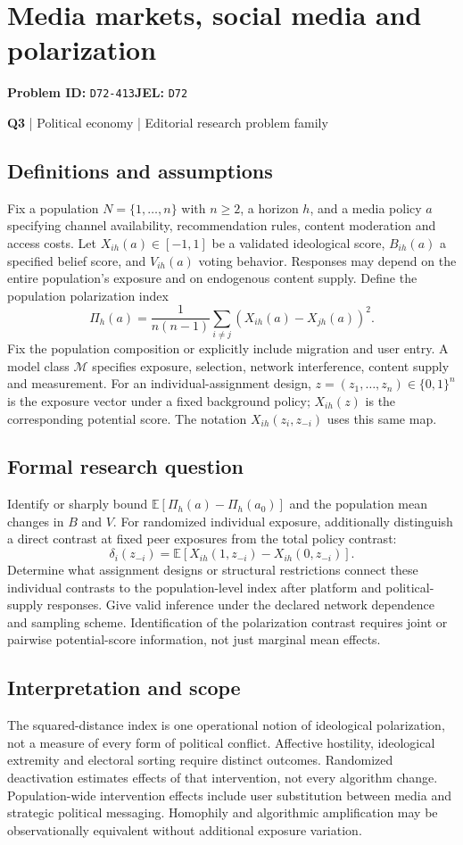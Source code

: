 \documentclass[11pt,a4paper]{article}
\begin{document}
\section*{Media markets, social media and polarization}
\textbf{Problem ID:} \texttt{D72-413}\quad \textbf{JEL:} \texttt{D72}\par
\label{problem:OP-0123}
\label{atlas:prob:Q3}
{\sffamily\small\color{muted}\textbf{Q3} | Political economy | Editorial research problem family\par}
\subsection*{Definitions and assumptions}
Fix a population $N=\{1,\ldots,n\}$ with $n\geq2$, a horizon $h$, and a media policy $a$ specifying channel availability, recommendation rules, content moderation and access costs. Let $X_{ih}(a)\in[-1,1]$ be a validated ideological score, $B_{ih}(a)$ a specified belief score, and $V_{ih}(a)$ voting behavior. Responses may depend on the entire population's exposure and on endogenous content supply. Define the population polarization index
\[
\Pi_h(a)=\frac{1}{n(n-1)}\sum_{i\ne j}(X_{ih}(a)-X_{jh}(a))^2.
\]
Fix the population composition or explicitly include migration and user entry. A model class $\mathcal M$ specifies exposure, selection, network interference, content supply and measurement. For an individual-assignment design, $z=(z_1,\ldots,z_n)\in\{0,1\}^n$ is the exposure vector under a fixed background policy; $X_{ih}(z)$ is the corresponding potential score. The notation $X_{ih}(z_i,z_{-i})$ uses this same map.
\subsection*{Formal research question}
Identify or sharply bound $\mathbb E[\Pi_h(a)-\Pi_h(a_0)]$ and the population mean changes in $B$ and $V$. For randomized individual exposure, additionally distinguish a direct contrast at fixed peer exposures from the total policy contrast:
\[
\delta_i(z_{-i})=\mathbb E[X_{ih}(1,z_{-i})-X_{ih}(0,z_{-i})].
\]
Determine what assignment designs or structural restrictions connect these individual contrasts to the population-level index after platform and political-supply responses. Give valid inference under the declared network dependence and sampling scheme. Identification of the polarization contrast requires joint or pairwise potential-score information, not just marginal mean effects.
\subsection*{Interpretation and scope}
The squared-distance index is one operational notion of ideological polarization, not a measure of every form of political conflict. Affective hostility, ideological extremity and electoral sorting require distinct outcomes. Randomized deactivation estimates effects of that intervention, not every algorithm change. Population-wide intervention effects include user substitution between media and strategic political messaging. Homophily and algorithmic amplification may be observationally equivalent without additional exposure variation.
\end{document}
